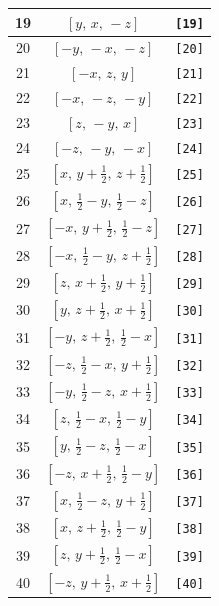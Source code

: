 \documentclass[fleqn,8pt]{jsarticle}
\begin{document}
\begin{longtable}{ccc}
19 & $\left[ y,\, x,\, - z \right]$ & {\tt [19]} \\ \hline
20 & $\left[ - y,\, - x,\, - z \right]$ & {\tt [20]} \\ \hline
21 & $\left[ - x,\, z,\, y \right]$ & {\tt [21]} \\ \hline
22 & $\left[ - x,\, - z,\, - y \right]$ & {\tt [22]} \\ \hline
23 & $\left[ z,\, - y,\, x \right]$ & {\tt [23]} \\ \hline
24 & $\left[ - z,\, - y,\, - x \right]$ & {\tt [24]} \\ \hline
25 & $\left[ x,\, y + \frac{1}{2},\, z + \frac{1}{2} \right]$ & {\tt [25]} \\ \hline
26 & $\left[ x,\, \frac{1}{2} - y,\, \frac{1}{2} - z \right]$ & {\tt [26]} \\ \hline
27 & $\left[ - x,\, y + \frac{1}{2},\, \frac{1}{2} - z \right]$ & {\tt [27]} \\ \hline
28 & $\left[ - x,\, \frac{1}{2} - y,\, z + \frac{1}{2} \right]$ & {\tt [28]} \\ \hline
29 & $\left[ z,\, x + \frac{1}{2},\, y + \frac{1}{2} \right]$ & {\tt [29]} \\ \hline
30 & $\left[ y,\, z + \frac{1}{2},\, x + \frac{1}{2} \right]$ & {\tt [30]} \\ \hline
31 & $\left[ - y,\, z + \frac{1}{2},\, \frac{1}{2} - x \right]$ & {\tt [31]} \\ \hline
32 & $\left[ - z,\, \frac{1}{2} - x,\, y + \frac{1}{2} \right]$ & {\tt [32]} \\ \hline
33 & $\left[ - y,\, \frac{1}{2} - z,\, x + \frac{1}{2} \right]$ & {\tt [33]} \\ \hline
34 & $\left[ z,\, \frac{1}{2} - x,\, \frac{1}{2} - y \right]$ & {\tt [34]} \\ \hline
35 & $\left[ y,\, \frac{1}{2} - z,\, \frac{1}{2} - x \right]$ & {\tt [35]} \\ \hline
36 & $\left[ - z,\, x + \frac{1}{2},\, \frac{1}{2} - y \right]$ & {\tt [36]} \\ \hline
37 & $\left[ x,\, \frac{1}{2} - z,\, y + \frac{1}{2} \right]$ & {\tt [37]} \\ \hline
38 & $\left[ x,\, z + \frac{1}{2},\, \frac{1}{2} - y \right]$ & {\tt [38]} \\ \hline
39 & $\left[ z,\, y + \frac{1}{2},\, \frac{1}{2} - x \right]$ & {\tt [39]} \\ \hline
40 & $\left[ - z,\, y + \frac{1}{2},\, x + \frac{1}{2} \right]$ & {\tt [40]} \\ \hline

\end{longtable}
\end{document}
